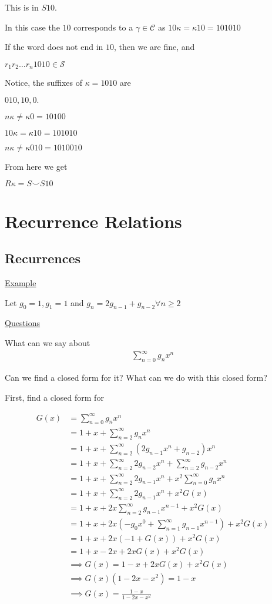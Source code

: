 \documentclass{article}
\newcommand\mc{\mathcal}
\begin{document}
This is in $S10$.

In this case the $10$ corresponds to a $\gamma \in \mc{C}$ as $10 \kappa = \kappa 10 = 101010$

If the word does not end in $10$, then we are fine, and 

$r_1r_2 \ldots r_n 1010 \in \mc{S}$

Notice, the suffixes of $\kappa = 1010$ are 

$010,10,0.$

$n \kappa \ne \kappa0 = 10100$ 

$10 \kappa = \kappa10 = 101010$

$n\kappa \ne \kappa 010 = 1010010$

From here we get 

$R \kappa = S \smile S10$


\section{Recurrence Relations}

\subsection{Recurrences}

\underline{Example}

Let $g_0 = 1, g_1 = 1$ and $g_n = 2g_{n-1} + g_{n-2} \forall n \ge 2$

\underline{Questions}

What can we say about
\begin{align*}
    \sum_{n=0}^{\infty} g_n x^n
\end{align*}

Can we find a closed form for it? What can we do with this closed form?

First, find a closed form for

\begin{align*}
    G(x) &= \sum_{n=0}^{\infty}g_nx^n \\
    &= 1 + x + \sum_{n=2}^{\infty} g_n x^n \\
    &= 1 + x + \sum_{n=2}^{\infty}(2 g_{n-1} x^n + g_{n-2})x^n \\
    &= 1 + x + \sum_{n=2}^{\infty}2g_{n-2}x^n + \sum_{n=2}^{\infty}g_{n-2}x^n \\
    &= 1 + x + \sum_{n=2}^{\infty}2g_{n-1}x^n + x^2 \sum_{n=0}^{\infty}g_nx^n \\
    &= 1 + x + \sum_{n=2}^{\infty}2g_{n-1}x^n + x^2 G(x) \\
    &= 1 + x + 2x \sum_{n=2}^{\infty}g_{n-1}x^{n-1} + x^2 G(x) \\ 
    &= 1 + x + 2x(-g_0x^0 + \sum_{n=1}^{\infty}g_{n-1}x^{n-1})+ x^2 G(x) \\
    &= 1 + x + 2x(-1 + G(x)) + x^2 G(x) \\
    &= 1 + x - 2x + 2xG(x) + x^2 G(x) \\
    &\implies G(x) = 1-x+2xG(x)+x^2G(x) \\
    &\implies G(x)(1-2x-x^2) = 1 - x \\
    &\implies G(x) = \frac{1-x}{1-2x-x^2}
\end{align*}
\end{document}
